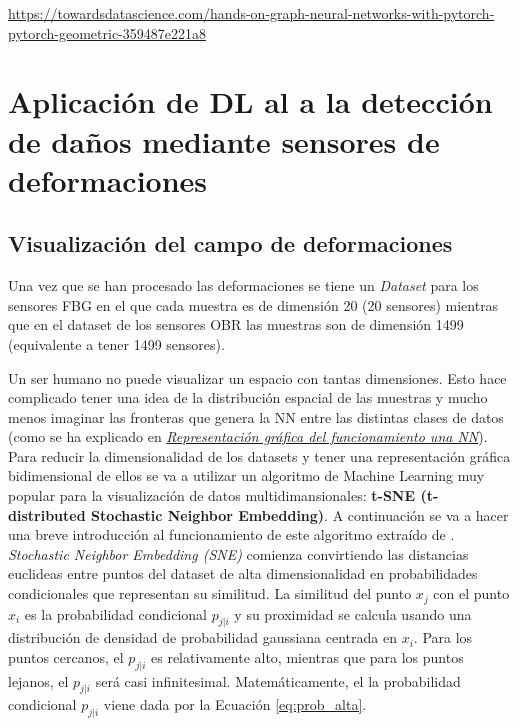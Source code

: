 \url{https://towardsdatascience.com/hands-on-graph-neural-networks-with-pytorch-pytorch-geometric-359487e221a8}

\clearpage




\section{Aplicación de DL al a la detección de daños mediante sensores de deformaciones}

\subsection{Visualización del campo de deformaciones}

Una vez que se han procesado las deformaciones se tiene un \textit{Dataset} para los sensores FBG en el que cada muestra es de dimensión 20 (20 sensores) mientras que en el dataset de los sensores OBR las muestras son de dimensión 1499 (equivalente a tener 1499 sensores).

Un ser humano no puede visualizar un espacio con tantas dimensiones. Esto hace complicado tener una idea de la distribución espacial de las muestras y mucho menos imaginar las fronteras que genera la NN entre las distintas clases de datos (como se ha explicado en \hyperref[sec:funcionamiento_DL]{\textit{Representación gráfica del funcionamiento una NN}}).\\

Para reducir la dimensionalidad de los datasets y tener una representación gráfica bidimensional de ellos se va a utilizar un algoritmo de Machine Learning muy popular para la visualización de datos multidimansionales: \textbf{t-SNE (t-distributed Stochastic Neighbor Embedding)}. A continuación se va a hacer una breve introducción al funcionamiento de este algoritmo extraído de \cite{t_sne}.\\

\textit{Stochastic Neighbor Embedding (SNE)} comienza convirtiendo las distancias euclideas entre puntos del dataset de alta dimensionalidad en probabilidades condicionales que representan su similitud. La similitud del punto $x_j$ con el punto $x_i$ es la probabilidad condicional $p_{j|i}$ y su proximidad se calcula usando una distribución de densidad de probabilidad gaussiana centrada en $x_i$. Para los puntos cercanos, el $p_{j|i}$ es relativamente alto, mientras que para los puntos lejanos, el $p_{j|i}$ será casi infinitesimal. Matemáticamente, el la probabilidad condicional $p_{j|i}$ viene dada por la Ecuación \ref{eq:prob_alta}.

